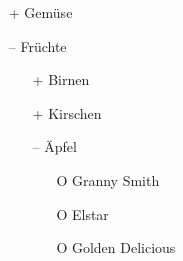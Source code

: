 \documentclass[varwidth]{standalone}
\begin{document}
\begin{itemize}
	\item[+] Gemüse
	\item[--] Früchte
	\begin{itemize}
		\item[+] Birnen 
		\item[+] Kirschen
		\item[--] Äpfel
		\begin{itemize}
			\item[O] Granny Smith
			\item[O] Elstar
			\item[O] Golden Delicious
		\end{itemize}
	\end{itemize}
\end{itemize}
\end{document}
